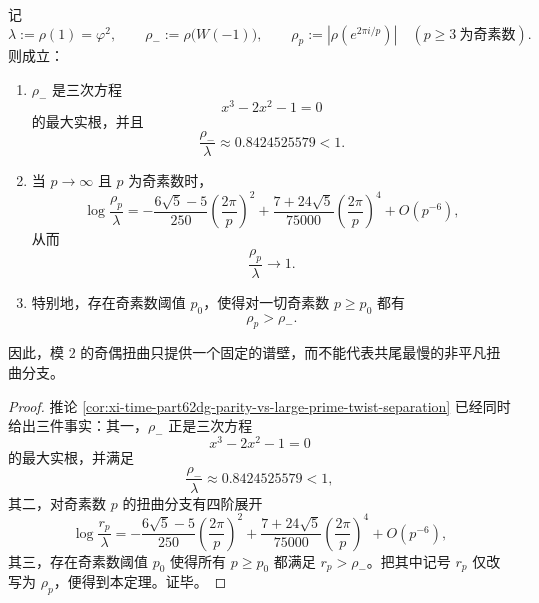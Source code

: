 \begin{theorem}[奇偶扭曲谱壁与共尾奇素数慢模的严格分离]\label{thm:xi-time-part9xg-parity-wall-versus-cofinal-prime-twists}
记
\[
\lambda:=\rho(1)=\varphi^2,
\qquad
\rho_-:=\rho\!\bigl(W(-1)\bigr),
\qquad
\rho_p:=\left|\rho\!\left(e^{2\pi i/p}\right)\right|
\quad (p\ge 3\ \text{为奇素数}).
\]
则成立：
\begin{enumerate}
  \item \(\rho_-\) 是三次方程
  \[
  x^3-2x^2-1=0
  \]
  的最大实根，并且
  \[
  \frac{\rho_-}{\lambda}\approx 0.8424525579<1.
  \]
  \item 当 \(p\to\infty\) 且 \(p\) 为奇素数时，
  \[
  \log\frac{\rho_p}{\lambda}
  =
  -\frac{6\sqrt5-5}{250}\left(\frac{2\pi}{p}\right)^2
  +\frac{7+24\sqrt5}{75000}\left(\frac{2\pi}{p}\right)^4
  +O(p^{-6}),
  \]
  从而
  \[
  \frac{\rho_p}{\lambda}\to 1.
  \]
  \item 特别地，存在奇素数阈值 \(p_0\)，使得对一切奇素数 \(p\ge p_0\) 都有
  \[
  \rho_p>\rho_-.
  \]
\end{enumerate}
因此，模 \(2\) 的奇偶扭曲只提供一个固定的谱壁，而不能代表共尾最慢的非平凡扭曲分支。
\end{theorem}
\begin{proof}
推论 \ref{cor:xi-time-part62dg-parity-vs-large-prime-twist-separation} 已经同时给出三件事实：其一，\(\rho_-\) 正是三次方程
\[
x^3-2x^2-1=0
\]
的最大实根，并满足
\[
\frac{\rho_-}{\lambda}\approx 0.8424525579<1,
\]
其二，对奇素数 \(p\) 的扭曲分支有四阶展开
\[
\log\frac{r_p}{\lambda}
=
-\frac{6\sqrt5-5}{250}\left(\frac{2\pi}{p}\right)^2
+\frac{7+24\sqrt5}{75000}\left(\frac{2\pi}{p}\right)^4
+O(p^{-6}),
\]
其三，存在奇素数阈值 \(p_0\) 使得所有 \(p\ge p_0\) 都满足 \(r_p>\rho_-\)。把其中记号 \(r_p\) 仅改写为 \(\rho_p\)，便得到本定理。证毕。
\end{proof}

